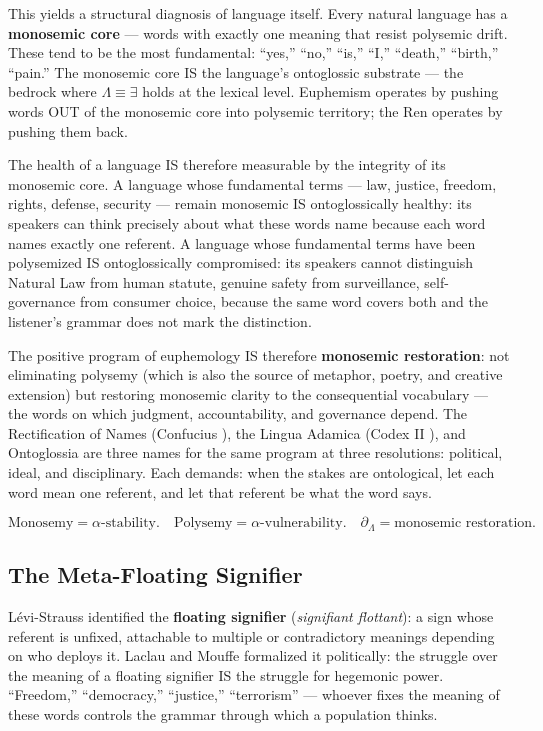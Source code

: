 \documentclass[11pt, oneside]{article}
\theoremstyle{definition}
\begin{document}
This yields a structural diagnosis of language itself. Every natural language has a \textbf{monosemic core} --- words with exactly one meaning that resist polysemic drift. These tend to be the most fundamental: ``yes,'' ``no,'' ``is,'' ``I,'' ``death,'' ``birth,'' ``pain.'' The monosemic core IS the language's ontoglossic substrate --- the bedrock where $\Lambda \equiv \exists$ holds at the lexical level. Euphemism operates by pushing words OUT of the monosemic core into polysemic territory; the Ren operates by pushing them back.

The health of a language IS therefore measurable by the integrity of its monosemic core. A language whose fundamental terms --- law, justice, freedom, rights, defense, security --- remain monosemic IS ontoglossically healthy: its speakers can think precisely about what these words name because each word names exactly one referent. A language whose fundamental terms have been polysemized IS ontoglossically compromised: its speakers cannot distinguish Natural Law from human statute, genuine safety from surveillance, self-governance from consumer choice, because the same word covers both and the listener's grammar does not mark the distinction.

The positive program of euphemology IS therefore \textbf{monosemic restoration}: not eliminating polysemy (which is also the source of metaphor, poetry, and creative extension) but restoring monosemic clarity to the consequential vocabulary --- the words on which judgment, accountability, and governance depend. The Rectification of Names (Confucius \cite{confucius}), the Lingua Adamica (Codex II \cite{codex2}), and Ontoglossia are three names for the same program at three resolutions: political, ideal, and disciplinary. Each demands: when the stakes are ontological, let each word mean one referent, and let that referent be what the word says.

$$\boxed{\text{Monosemy} = \alpha\text{-stability}. \quad \text{Polysemy} = \alpha\text{-vulnerability}. \quad \partial_\Lambda = \text{monosemic restoration}.}$$

\subsection{The Meta-Floating Signifier}

L\'{e}vi-Strauss \cite{levistrauss} identified the \textbf{floating signifier} (\textit{signifiant flottant}): a sign whose referent is unfixed, attachable to multiple or contradictory meanings depending on who deploys it. Laclau and Mouffe \cite{laclau} formalized it politically: the struggle over the meaning of a floating signifier IS the struggle for hegemonic power. ``Freedom,'' ``democracy,'' ``justice,'' ``terrorism'' --- whoever fixes the meaning of these words controls the grammar through which a population thinks.
\end{document}
